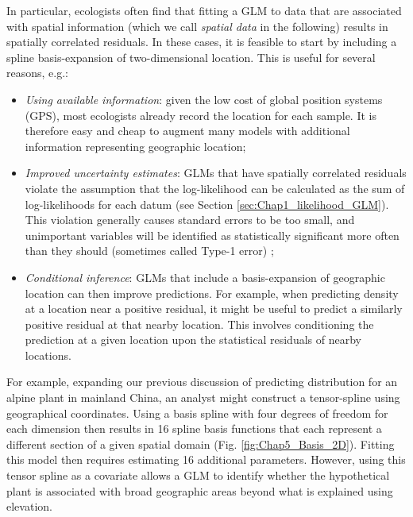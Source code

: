 In particular, ecologists often find that fitting a GLM to data that are associated with spatial information (which we call \textit{spatial data} in the following) results in spatially correlated residuals. In these cases, it is feasible to start by including a spline basis-expansion of two-dimensional location.  This is useful for several reasons, e.g.:

\begin{itemize}
    \item \textit{Using available information}:  given the low cost of global position systems (GPS), most ecologists already record the location for each sample.  It is therefore easy and cheap to augment many models with additional information representing geographic location;

    \item \textit{Improved uncertainty estimates}:  GLMs that have spatially correlated residuals violate the assumption that the log-likelihood can be calculated as the sum of log-likelihoods for each datum (see Section \ref{sec:Chap1_likelihood_GLM}).  This violation generally causes standard errors to be too small, and unimportant variables will be identified as statistically significant more often than they should (sometimes called Type-1 error) \cite{dormann_correlation_2012}; 

    \item \textit{Conditional inference}: GLMs that include a basis-expansion of geographic location can then improve predictions.  For example, when predicting density at a location near a positive residual, it might be useful to predict a similarly positive residual at that nearby location.  This involves conditioning the prediction at a given location upon the statistical residuals of nearby locations.
\end{itemize}
For example, expanding our previous discussion of predicting distribution for an alpine plant in mainland China, an analyst might construct a tensor-spline using geographical coordinates.  Using a basis spline with four degrees of freedom for each dimension then results in 16 spline basis functions that each represent a different section of a given spatial domain (Fig. \ref{fig:Chap5_Basis_2D}).  Fitting this model then requires estimating 16 additional parameters.  However, using this tensor spline as a covariate allows a GLM to identify whether the hypothetical plant is associated with broad geographic areas beyond what is explained using elevation.  

